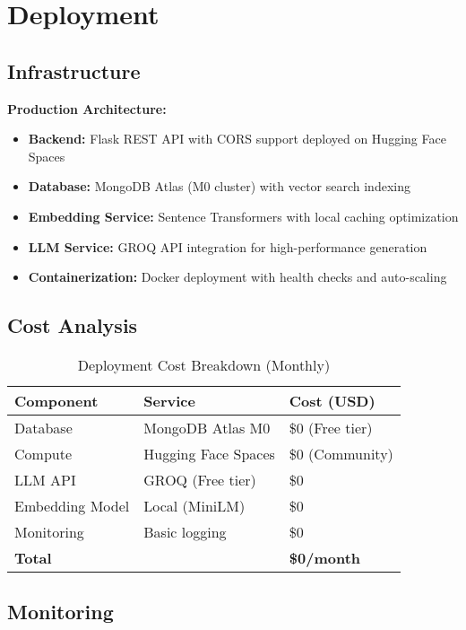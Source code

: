 \documentclass[11pt,a4paper]{article}
\begin{document}
\section{Deployment}

\subsection{Infrastructure}

\textbf{Production Architecture:}
\begin{itemize}
    \item \textbf{Backend:} Flask REST API with CORS support deployed on Hugging Face Spaces
    \item \textbf{Database:} MongoDB Atlas (M0 cluster) with vector search indexing
    \item \textbf{Embedding Service:} Sentence Transformers with local caching optimization
    \item \textbf{LLM Service:} GROQ API integration for high-performance generation
    \item \textbf{Containerization:} Docker deployment with health checks and auto-scaling
\end{itemize}

\subsection{Cost Analysis}

\begin{table}[h!]
\centering
\caption{Deployment Cost Breakdown (Monthly)}
\begin{tabular}{@{}lll@{}}
\toprule
\textbf{Component} & \textbf{Service} & \textbf{Cost (USD)} \\
\midrule
Database & MongoDB Atlas M0 & \$0 (Free tier) \\
Compute & Hugging Face Spaces & \$0 (Community) \\
LLM API & GROQ (Free tier) & \$0 \\
Embedding Model & Local (MiniLM) & \$0 \\
Monitoring & Basic logging & \$0 \\
\midrule
\textbf{Total} & & \textbf{\$0/month} \\
\bottomrule
\end{tabular}
\label{tab:costs}
\end{table}

\subsection{Monitoring}
\end{document}
